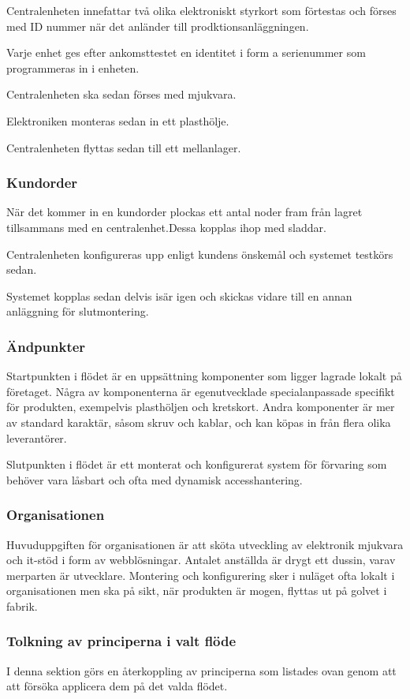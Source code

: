 \documentclass{article}
\begin{document}
Centralenheten innefattar två olika elektroniskt styrkort som förtestas och förses med ID nummer när det anländer till prodktionsanläggningen. 

Varje enhet ges efter ankomsttestet en identitet i form a serienummer som programmeras in i enheten.

Centralenheten ska sedan förses med mjukvara.

Elektroniken monteras sedan in ett plasthölje.

Centralenheten flyttas sedan till ett mellanlager.

\subsubsection*{Kundorder}
När det kommer in en kundorder plockas ett antal noder fram från lagret tillsammans med en centralenhet.Dessa kopplas ihop med sladdar.

Centralenheten konfigureras upp enligt kundens önskemål och systemet testkörs sedan. 

Systemet kopplas sedan delvis isär igen och skickas vidare till en annan anläggning för slutmontering.


\subsubsection*{Ändpunkter}
Startpunkten i flödet är en uppsättning komponenter som ligger lagrade lokalt på företaget. Några av komponenterna är egenutvecklade specialanpassade specifikt för produkten, exempelvis plasthöljen och kretskort. Andra komponenter är mer av standard karaktär, såsom skruv och kablar, och kan köpas in från flera olika leverantörer.

Slutpunkten i flödet är ett monterat och konfigurerat system för förvaring som behöver vara låsbart och ofta med dynamisk accesshantering.

\subsubsection*{Organisationen} 
Huvuduppgiften för organisationen är att sköta utveckling av elektronik mjukvara och it-stöd i form av webblösningar. Antalet anställda är drygt ett dussin, varav merparten är utvecklare. Montering och konfigurering sker i nuläget ofta lokalt i organisationen men ska på sikt, när produkten är mogen, flyttas ut på golvet i fabrik.

\subsubsection*{Tolkning av principerna i valt flöde}
I denna sektion görs en återkoppling av principerna som listades ovan genom att att försöka applicera dem på det valda flödet. 
\end{document}
